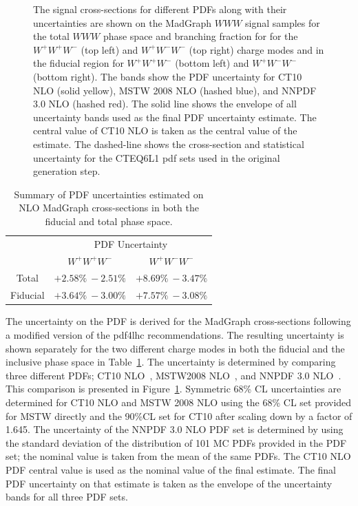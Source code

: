 \begin{figure}[ht!]
\caption{The signal cross-sections for different PDFs along with their
uncertainties are shown on the {\sc MadGraph} $WWW$ signal samples
for the total $WWW$ phase space and branching fraction for
for the $W^{+}W^{+}W^{-}$ (top left) and $W^{+}W^{-}W^{-}$ (top right)
charge modes
and in the fiducial region for $W^{+}W^{+}W^{-}$ (bottom left) 
and $W^{+}W^{-}W^{-}$ (bottom right).
The bands show the PDF uncertainty for CT10 NLO (solid yellow),
MSTW 2008 NLO (hashed blue), and NNPDF 3.0 NLO (hashed red). The
solid line shows the envelope of all uncertainty bands used as the final
PDF uncertainty estimate. The central value of CT10 NLO is taken as the
central value of the estimate.
The dashed-line shows the cross-section and 
statistical uncertainty for the CTEQ6L1
pdf sets used in the original generation step.}
\label{fig:signal_pdf_unc}
\end{figure}

\begin{table}[ht!]
\centering
\begin{tabular}{c|c|c}
\hline
 & \multicolumn{2}{c}{PDF Uncertainty}\\
 & $W^{+}W^{+}W^{-}$ & $W^{+}W^{-}W^{-}$ \\
\hline
\hline
Total & $+2.58\%~-2.51\%$ &  $+8.69\%~-3.47\%$ \\
Fiducial & $+3.64\%~-3.00\%$ & $+7.57\%~-3.08\%$ \\
\hline
\end{tabular}
\caption{Summary of PDF uncertainties estimated on NLO {\sc MadGraph} cross-sections
in both the fiducial and total phase space.}
\label{tab:pdfunc}
\end{table}

The uncertainty on the PDF is derived for the {\sc MadGraph} 
cross-sections following a modified version of the pdf4lhc
\cite{Botje:2011sn} recommendations.  The resulting 
uncertainty is shown separately for the two different charge modes
in both the fiducial and the inclusive phase
space in Table~\ref{tab:pdfunc}.
The uncertainty is determined by comparing three different PDFs;
CT10 NLO~\cite{Lai:2010vv}, MSTW2008 NLO~\cite{Martin:2009iq}, 
and NNPDF 3.0 NLO~\cite{Ball:2014uwa}. 
This comparison is presented in Figure~\ref{fig:signal_pdf_unc}.  
Symmetric 68\% CL uncertainties 
are determined for CT10 NLO and MSTW 2008 NLO using the 68\% CL 
set provided for MSTW directly and the 90\%CL set for CT10 after
scaling down by 
a factor of 1.645. The uncertainty of the NNPDF 3.0 NLO PDF set is 
determined by using the standard deviation of the distribution 
of 101 MC PDFs provided in the PDF set; the nominal value is taken
from the mean of the same PDFs.  
The CT10 NLO PDF central value is used as the nominal 
value of the final estimate.
The final PDF uncertainty on that estimate is
taken as the envelope of the uncertainty bands for all three PDF sets.  



